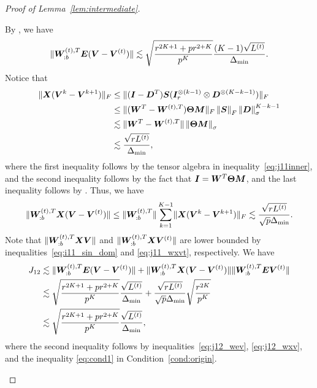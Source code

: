 \documentclass[lettersize,onecolumn,journal]{IEEEtran}
\theoremstyle{definition}
\theoremstyle{definition}
\begin{document}
\begin{proof}[Proof of Lemma~\ref{lem:intermediate}]
\begin{enumerate}
    By \citet[Proof of Lemma 5]{han2020exact}, we have 
    \begin{equation}\label{eq:j12_wev}
        \onormSize{}{\mW_{:b}^{(t),T} \mE (\mV-\mV^{(t)})} \lesssim \sqrt{ \frac{r^{2K+1} + p r^{2 + K}}{p^K} } \frac{(K-1)\sqrt{L^{(t)}}}{\Delta_{\min}}.
    \end{equation}
    Notice that 
    \begin{align}
        \lVert\bm X (\bm{V}^k-\bm{V}^{k+1})\rVert_F &\leq \lVert(\bm I - \bm{D}^T) \bm S (\bm I_r^{\otimes (k-1)} \otimes  \bm{D}^{\otimes (K-k-1)})\rVert_F \\
        &\leq \lVert(\bm{W}^T - \bm{W}^{(t),T}) \boldsymbol{\Theta} \bm M\rVert_F \left\lVert\bm S\right\rVert_F \left\lVert \bm{D}\right\rVert_{\sigma}^{K-k-1}\\
        & \lesssim \lVert \bm{W}^T - \bm{W}^{(t),T} \rVert \left\lVert\boldsymbol{\Theta} \bm M\right\rVert_{\sigma} \\
        & \lesssim \frac{ \sqrt{r L^{(t)}}}{\Delta_{\min}},
    \end{align}
    where the first inequality follows by the tensor algebra in 
    inequality~\eqref{eq:j11inner}, and the second inequality follows by the fact  that $\bm I = \bm{W}^T \boldsymbol{\Theta} \bm M$, and the last inequality follows by \citet[Proof of Lemma 5]{han2020exact}. Thus, we have
    \begin{equation}
           \onormSize{}{\mW_{:b}^{(t),T} \mX (\mV-\mV^{(t)})}\leq \onormSize{}{\mW_{:b}^{(t),T} }  \sum_{k = 1}^{K-1} \onormSize{}{\mX (\mV^k-\mV^{k+1})}_F \lesssim \frac{ \sqrt{r L^{(t)}}}{\sqrt{p} \Delta_{\min}}.\label{eq:j12_wxv}
    \end{equation}
    Note that $\lVert\bm{W}_{:b}^{(t),T} \bm X \bm{V} \rVert$ and $\lVert\bm{W}_{:b}^{(t),T} \bm X \bm{V}^{(t)} \rVert$ are lower bounded by inequalities~\eqref{eq:i11_sin_dom} and \eqref{eq:j11_wxvt}, respectively. We have 
    \begin{align}
        J_{12} &\lesssim \lVert\bm{W}_{:b}^{(t),T} \bm{E} (\bm{V}-\bm{V}^{(t)})\rVert + \lVert\bm{W}_{:b}^{(t),T} \bm X (\bm{V}-\bm{V}^{(t)})\rVert\lVert\bm{W}_{:b}^{(t),T} \bm{E} \bm{V}^{(t)} \rVert\\
        &\lesssim \sqrt{ \frac{r^{2K+1} + p r^{2 + K}}{p^K} } \frac{\sqrt{L^{(t)}}}{\Delta_{\min}} + \frac{ \sqrt{r L^{(t)}}}{\sqrt{p} \Delta_{\min}} \sqrt{\frac{r^{2K}}{p^K}} \\
        & \lesssim  \sqrt{ \frac{r^{2K+1} + p r^{2 + K}}{p^K} } \frac{\sqrt{L^{(t)}}}{\Delta_{\min}},
    \end{align}
    where the second inequality follows by inequalities~\eqref{eq:j12_wev}, \eqref{eq:j12_wxv}, and the inequality \eqref{eq:cond1} in Condition~\ref{cond:origin}.
    


\end{enumerate}
\end{proof}
\end{document}
